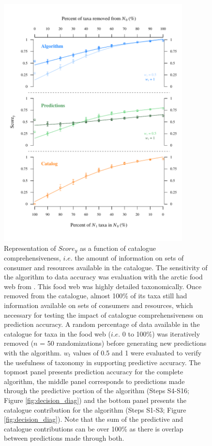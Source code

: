 \begin{figure}[H]
  \centering\includegraphics[height=35em]{./figures/ch2-catalog_predictions3.pdf}
  \caption{Representation of $Score_y$ as a function of catalogue comprehensiveness, $i.e.$ the amount of information on sets of consumer and resources available in the catalogue. The sensitivity of the algorithm to data accuracy was evaluation with the arctic food web from \citet{kortsch2015}. This food web was highly detailed taxonomically. Once removed from the catalogue, almost 100\% of its taxa still had information available on sets of consumers and resources, which necessary for testing the impact of catalogue comprehensiveness on prediction accuracy. A random percentage of data available in the catalogue for taxa in the food web ($i.e.$ 0 to 100\%) was iteratively removed ($n$ = 50 randomizations) before generating new predictions with the algorithm. $w_t$ values of 0.5 and 1 were evaluated to verify the usefulness of taxonomy in supporting predictive accuracy. The topmost panel presents prediction accuracy for the complete algorithm, the middle panel corresponds to predictions made through the predictive portion of the algorithm (Steps S4-S16; Figure \ref{fig:decision_diag}) and the bottom panel presents the catalogue contribution for the algorithm (Steps S1-S3; Figure \ref{fig:decision_diag}). Note that the sum of the predictive and catalogue contributions can be over 100\% as there is overlap between predictions made through both.}
  \label{fig:catalog_pred}
\end{figure}


